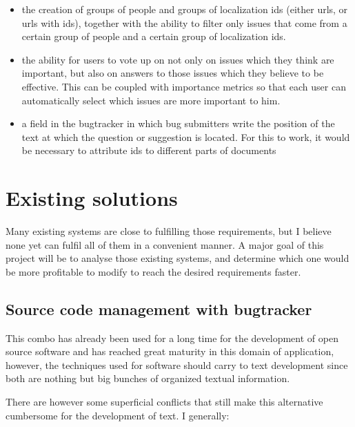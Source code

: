 \documentclass[12pt]{article}
\begin{document}
\begin{itemize}
  \item the creation of groups of people and groups of localization ids (either urls, or urls with ids), together with the ability to filter only issues that come from a certain group of people and a certain group of localization ids.
  \item the ability for users to vote up on not only on issues which they think are important, but also on answers to those issues which they believe to be effective. This can be coupled with importance metrics so that each user can automatically select which issues are more important to him.
  \item a field in the bugtracker in which bug submitters write the position of the text at which the question or suggestion is located. For this to work, it would be necessary to attribute ids to different parts of documents
\end{itemize}

\section{Existing solutions} \label{existing-solutions}

Many existing systems are close to fulfilling those requirements, but I believe none yet can fulfil all of them in a convenient manner. A major goal of this project will be to analyse those existing systems, and determine which one would be more profitable to modify to reach the desired requirements faster.

\subsection{Source code management with bugtracker}

This combo has already been used for a long time for the development of open source software and has reached great maturity in this domain of application, however, the techniques used for software should carry to text development since both are nothing but big bunches of organized textual information.

There are however some superficial conflicts that still make this alternative cumbersome for the development of text. I generally:
\end{document}
